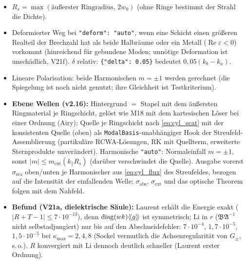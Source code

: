 \begin{itemize}[nosep]
  \item $R_s=\max(\text{äußerster Ringradius},\,2w_0)$ (ohne Ringe bestimmt der Strahl die Dichte).
  \item Deformierter Weg bei \verb|"deform": "auto"|, wenn eine Schicht einen größeren Realteil der Brechzahl hat als
        beide Halbräume oder ein Metall ($\operatorname{Re}\varepsilon<0$) vorkommt (hinreichend für gebundene Moden;
        unnötige Deformation ist unschädlich, V21f). $\delta$ relativ: \verb|{"delta": 0.05}| bedeutet $0{,}05(k_b-k_a)$.
  \item Lineare Polarisation: beide Harmonischen $m=\pm1$ werden gerechnet (die Spiegelung ist noch nicht genutzt; ihre
        Gleichheit ist Testkriterium).
  \item \textbf{Ebene Wellen (v2.16):} Hintergrund $=$ Stapel mit dem äußersten Ringmaterial je Ringschicht, gelöst wie
        M18 mit dem kartesischen Löser bei einer Ordnung (Airy); Quelle je Ringschicht nach \eqref{eq:cyl_scat} mit der
        konsistenten Quelle (oben) als \verb|ModalBasis|-unabhängiger Hook der Streufeld-Assemblierung
        (partikuläre RCWA-Lösungen, RK mit Quellterm, erweiterte Sternprodukte unverändert). Harmonische \verb|"auto"|:
        Normaleinfall $m=\pm1$, sonst $|m|\le m_{\text{cut}}(k_\parallel R_s)$ (darüber verschwindet die Quelle).
        Ausgabe vorerst $\sigma_{\text{sca}}$ oben/unten je Harmonischer aus \eqref{eq:cyl_flux} des Streufeldes,
        bezogen auf die Intensität der einfallenden Welle; $\sigma_{\text{abs}}$, $\sigma_{\text{ext}}$ und das optische
        Theorem folgen mit dem Nahfeld.
  \item \textbf{Befund (V21a, dielektrische Säule):} Laurent erhält die Energie exakt ($|R+T-1|\le7\cdot10^{-13}$), denn
        $\operatorname{diag}(wk)\langle\!\langle g\rangle\!\rangle$ ist symmetrisch; Li in $r$ ($\mathfrak B\mathfrak A^{-1}$ nicht selbstadjungiert)
        nur bis auf den Abschneidefehler: $7\cdot10^{-4}$, $1{,}7\cdot10^{-5}$, $1{,}5\cdot10^{-5}$ bei
        $\kappa_{\max}=2,4,8$ (Sockel vermutlich die Achsenregularität von $G_\pm$, s.\,o.). $R$ konvergiert mit Li
        dennoch deutlich schneller (Laurent erster Ordnung).
\end{itemize}

